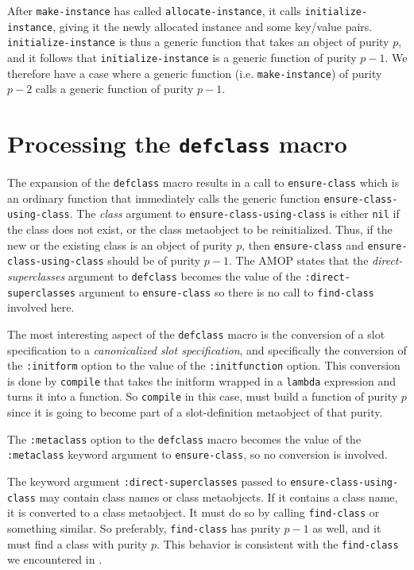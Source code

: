 After \texttt{make-instance} has called \texttt{allocate-instance}, it
calls \texttt{initialize-instance}, giving it the newly allocated
instance and some key/value pairs.  \texttt{initialize-instance} is
thus a generic function that takes an object of purity $p$, and it
follows that \texttt{initialize-instance} is a generic function of
purity $p-1$.  We therefore have a case where a generic function
(i.e. \texttt{make-instance}) of purity $p-2$ calls a generic function
of purity $p-1$.

\section{Processing the \texttt{defclass} macro}

The expansion of the \texttt{defclass} macro results in a call to
\texttt{ensure-class} which is an ordinary function that immediately
calls the generic function \texttt{ensure-class-using-class}.  The
\textit{class} argument to \texttt{ensure-class-using-class} is either
\texttt{nil} if the class does not exist, or the class metaobject to
be reinitialized.  Thus, if the new or the existing class is an object
of purity $p$, then \texttt{ensure-class} and
\texttt{ensure-class-using-class} should be of purity $p-1$.
The AMOP states that the \emph{direct-superclasses} argument to
\texttt{defclass} becomes the value of the
\texttt{:direct-superclasses} argument to \texttt{ensure-class} so
there is no call to \texttt{find-class} involved here.

The most interesting aspect of the \texttt{defclass} macro is the
conversion of a slot specification to a \emph{canonicalized slot
  specification}, and specifically the conversion of the
\texttt{:initform} option to the value of the \texttt{:initfunction}
option.  This conversion is done by \texttt{compile} that takes the
initform wrapped in a \texttt{lambda} expression and turns it into a
function.  So \texttt{compile} in this case, must build a function of
purity $p$ since it is going to become part of a slot-definition
metaobject of that purity.

The \texttt{:metaclass} option to the \texttt{defclass} macro becomes
the value of the \texttt{:metaclass} keyword argument to
\texttt{ensure-class}, so no conversion is involved.

The keyword argument \texttt{:direct-superclasses} passed to
\texttt{ensure-class-using-class} may contain class names or class
metaobjects.  If it contains a class name, it is converted to a class
metaobject.  It must do so by calling \texttt{find-class} or something
similar.  So preferably, \texttt{find-class} has purity $p-1$ as well,
and it must find a class with purity $p$.  This behavior is consistent
with the \texttt{find-class} we encountered in
.

